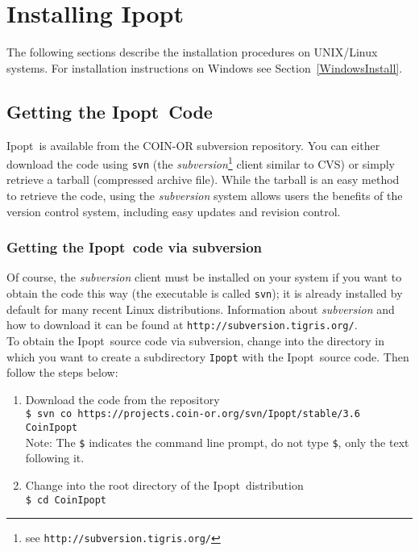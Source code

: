 \documentclass[10pt]{article}
\newcommand{\Ipopt}{{\sc Ipopt}}
\begin{document}
\section{Installing \Ipopt}\label{Installing}

The following sections describe the installation procedures on
UNIX/Linux systems.  For installation instructions on Windows
see Section~\ref{WindowsInstall}.

\subsection{Getting the \Ipopt\ Code}
\Ipopt\ is available from the COIN-OR subversion repository. You can
either download the code using \texttt{svn} (the
\textit{subversion}\footnote{see
  \texttt{http://subversion.tigris.org/}} client similar to CVS) or
simply retrieve a tarball (compressed archive file).  While the
tarball is an easy method to retrieve the code, using the
\textit{subversion} system allows users the benefits of the version
control system, including easy updates and revision control.

\subsubsection{Getting the \Ipopt\ code via subversion}

Of course, the \textit{subversion} client must be installed on your
system if you want to obtain the code this way (the executable is
called \texttt{svn}); it is already installed by default for many
recent Linux distributions.  Information about \textit{subversion} and
how to download it can be found at
\texttt{http://subversion.tigris.org/}.\\

To obtain the \Ipopt\ source code via subversion, change into the
directory in which you want to create a subdirectory {\tt Ipopt} with
the \Ipopt\ source code.  Then follow the steps below:
\begin{enumerate}
\item{Download the code from the repository}\\
{\tt \$ svn co https://projects.coin-or.org/svn/Ipopt/stable/3.6 CoinIpopt} \\
Note: The {\tt \$} indicates the command line
prompt, do not type {\tt \$}, only the text following it.
\item Change into the root directory of the \Ipopt\ distribution\\
{\tt \$ cd CoinIpopt}
\end{enumerate}
\end{document}
